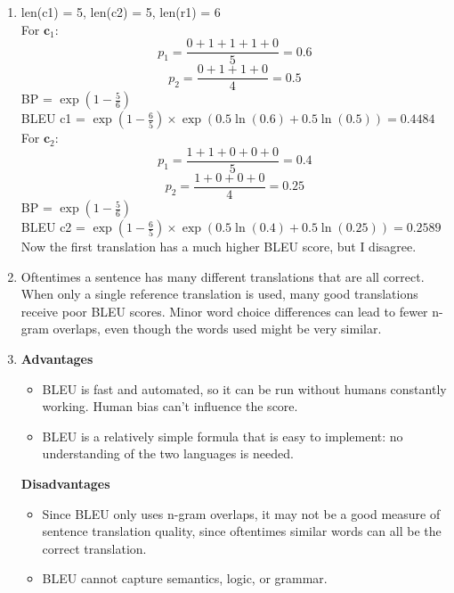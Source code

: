 \documentclass{article}
\begin{document}
\begin{enumerate}[label=(\alph*)]
\begin{enumerate}[label=\roman*.]
    \item 
    len(c1) = 5, len(c2) = 5, len(r1) = 6 \\
    For $\textbf{c}_1$: \\
    \[
    p_1 = \frac{0 + 1 + 1 + 1 + 0}{5} = 0.6
    \]
    \[
    p_2 = \frac{0 + 1 + 1 + 0}{4} = 0.5
    \]
    BP = $\exp(1 - \frac{5}{6})$ \\
    BLEU c1 = $\exp(1 - \frac{6}{5}) \times \exp(0.5 \ln(0.6) + 0.5 \ln(0.5)) = \mathbf{0.4484}$ \\
    For $\textbf{c}_2$: \\
    \[
    p_1 = \frac{1 + 1 + 0 + 0 + 0}{5} = 0.4
    \]
    \[
    p_2 = \frac{1 + 0 + 0 + 0}{4} = 0.25
    \]
    BP = $\exp(1 - \frac{5}{6})$ \\
    BLEU c2 = $\exp(1 - \frac{6}{5}) \times \exp(0.5 \ln(0.4) + 0.5 \ln(0.25)) = \mathbf{0.2589}$ \\
    Now the first translation has a much higher BLEU score, but I disagree.
    \item Oftentimes a sentence has many different translations that are all correct. When only a single reference translation is used, many good translations receive poor BLEU scores. Minor word choice differences can lead to fewer n-gram overlaps, even though the words used might be very similar.
    \item \textbf{Advantages}
    \begin{itemize}
        \item BLEU is fast and automated, so it can be run without humans constantly working. Human bias can't influence the score.
        \item BLEU is a relatively simple formula that is easy to implement: no understanding of the two languages is needed.
    \end{itemize}
    \textbf{Disadvantages}
    \begin{itemize}
        \item Since BLEU only uses n-gram overlaps, it may not be a good measure of sentence translation quality, since oftentimes similar words can all be the correct translation.
        \item BLEU cannot capture semantics, logic, or grammar.
    \end{itemize}
    \end{enumerate}
    
\end{enumerate}
\end{document}
